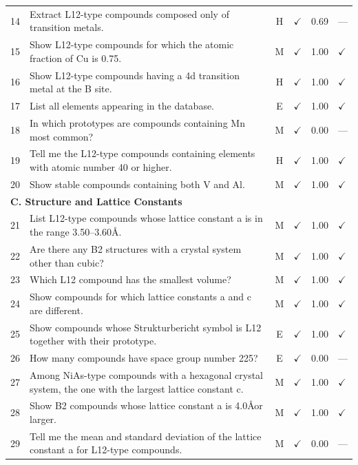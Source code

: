 \documentclass[5p,twocolumn]{elsarticle}
\begin{document}
\begin{longtable}{clcccl}
    14 & Extract L12-type compounds composed only of transition metals. & H & $\checkmark$ & 0.69 & --- \\
    15 & Show L12-type compounds for which the atomic fraction of Cu is 0.75. & M & $\checkmark$ & 1.00 & $\checkmark$ \\
    16 & Show L12-type compounds having a 4d transition metal at the B site. & H & $\checkmark$ & 1.00 & $\checkmark$ \\
    17 & List all elements appearing in the database. & E & $\checkmark$ & 1.00 & $\checkmark$ \\
    18 & In which prototypes are compounds containing Mn most common? & M & $\checkmark$ & 0.00 & --- \\
    19 & Tell me the L12-type compounds containing elements with atomic number 40 or higher. & H & $\checkmark$ & 1.00 & $\checkmark$ \\
    20 & Show stable compounds containing both V and Al. & M & $\checkmark$ & 1.00 & $\checkmark$ \\
    \midrule
    \multicolumn{6}{l}{\textbf{C. Structure and Lattice Constants}} \\
    \midrule
    21 & List L12-type compounds whose lattice constant a is in the range 3.50--3.60\AA . & M & $\checkmark$ & 1.00 & $\checkmark$ \\
    22 & Are there any B2 structures with a crystal system other than cubic? & M & $\checkmark$ & 1.00 & $\checkmark$ \\
    23 & Which L12 compound has the smallest volume? & M & $\checkmark$ & 1.00 & $\checkmark$ \\
    24 & Show compounds for which lattice constants a and c are different. & M & $\checkmark$ & 1.00 & $\checkmark$ \\
    25 & Show compounds whose Strukturbericht symbol is L12 together with their prototype. & E & $\checkmark$ & 1.00 & $\checkmark$ \\
    26 & How many compounds have space group number 225? & E & $\checkmark$ & 0.00 & --- \\
    27 & Among NiAs-type compounds with a hexagonal crystal system, the one with the largest lattice constant c. & M & $\checkmark$ & 1.00 & $\checkmark$ \\
    28 & Show B2 compounds whose lattice constant a is 4.0\AA  or larger. & M & $\checkmark$ & 1.00 & $\checkmark$ \\
    29 & Tell me the mean and standard deviation of the lattice constant a for L12-type compounds. & M & $\checkmark$ & 0.00 & --- \\

\end{longtable}
\end{document}
